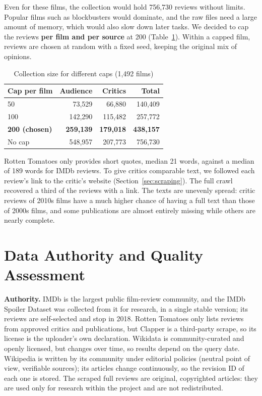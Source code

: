 Even for these films, the collection would hold 756,730 reviews without limits. Popular films such as blockbusters would dominate, and the raw files need a large amount of memory, which would also slow down later tasks. We decided to cap the reviews \textbf{per film and per source} at 200 (Table~\ref{tab:cap}). Within a capped film, reviews are chosen at random with a fixed seed, keeping the original mix of opinions.

\begin{table}[h]
  \centering
  \caption{Collection size for different caps (1,492 films)}
  \label{tab:cap}
  \small
  \begin{tabular}{lrrr}
    \toprule
    Cap per film & Audience & Critics & Total \\
    \midrule
    50 & 73,529 & 66,880 & 140,409 \\
    100 & 142,290 & 115,482 & 257,772 \\
    \textbf{200 (chosen)} & \textbf{259,139} & \textbf{179,018} & \textbf{438,157} \\
    No cap & 548,957 & 207,773 & 756,730 \\
    \bottomrule
  \end{tabular}
\end{table}

Rotten Tomatoes only provides short quotes, median 21 words, against a median of 189 words for IMDb reviews. To give critics comparable text, we followed each review's link to the critic's website (Section~\ref{sec:scraping}). The full crawl recovered a third of the reviews with a link. The texts are unevenly spread: critic reviews of 2010s films have a much higher chance of having a full text than those of 2000s films, and some publications are almost entirely missing while others are nearly complete.

\section{Data Authority and Quality Assessment}
\textbf{Authority.} IMDb is the largest public film-review community, and the IMDb Spoiler Dataset was collected from it for research, in a single stable version; its reviews are self-selected and stop in 2018. Rotten Tomatoes only lists reviews from approved critics and publications, but Clapper is a third-party scrape, so its license is the uploader's own declaration. Wikidata is community-curated and openly licensed, but changes over time, so results depend on the query date. Wikipedia is written by its community under editorial policies (neutral point of view, verifiable sources); its articles change continuously, so the revision ID of each one is stored. The scraped full reviews are original, copyrighted articles: they are used only for research within the project and are not redistributed.

